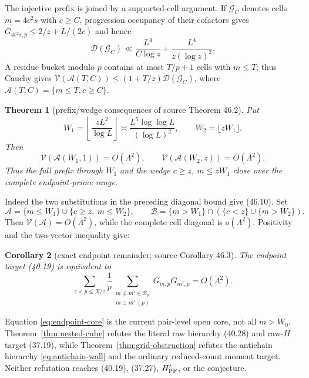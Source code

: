 \documentclass[10pt,reqno]{amsart}
\newtheorem{theorem}{Theorem}[section]
\newtheorem{corollary}[theorem]{Corollary}
\theoremstyle{definition}
\newcommand{\1}{\mathbf 1}
\begin{document}
The injective prefix is joined by a supported-cell argument.  If
$\mathscr G_C$ denotes cells $m=4c^2s$ with $c\geq C$, progression occupancy
of their cofactors gives $G_{4c^2s,p}\leq2/z+L/(2c)$ and hence
\[
 \mathcal D(\mathscr G_C)
 \ll\frac{L^4}{C\log z}+\frac{L^4}{z(\log z)^2}.
\]
A residue bucket modulo $p$ contains at most $T/p+1$ cells with $m\leq T$;
thus Cauchy gives
$\mathcal V(\mathscr A(T,C))\leq(1+T/z)\mathcal D(\mathscr G_C)$, where
$\mathscr A(T,C)=\{m\leq T,c\geq C\}$.
\begin{theorem}[prefix/wedge consequences of source Theorem 46.2]
\label{thm:endpoint-wedge}
Put
\begin{equation}\tag{46.8}
 W_1=\left\lfloor\frac{zL^2}{\log L}\right\rfloor
 \asymp\frac{L^5\log\log L}{(\log L)^2},
 \qquad W_2=\lfloor zW_1\rfloor.
\end{equation}
Then
\begin{equation}\tag{46.10}
 \mathcal V(\mathscr A(W_1,1))=O(\Lambda^2),\qquad
 \mathcal V(\mathscr A(W_2,z))=O(\Lambda^2).
\end{equation}
Thus the full prefix through $W_1$ and the wedge $c\geq z$, $m\leq zW_1$
close over the complete endpoint-prime range.
\end{theorem}
Indeed the two substitutions in the preceding diagonal bound give (46.10).
Set
\[
 \mathscr A=\{m\leq W_1\}\cup\{c\geq z,\ m\leq W_2\},\qquad
 \mathscr B=\{m>W_1\}\cap(\{c<z\}\cup\{m>W_2\}).
\]
Then $\mathcal V(\mathscr A)=O(\Lambda^2)$, while the complete cell
diagonal is $o(\Lambda^2)$.  Positivity and the two-vector inequality give:
\begin{corollary}[exact endpoint remainder; source Corollary 46.3]
\label{cor:endpoint-core}
The endpoint target (40.19) is equivalent to
\begin{equation}\tag{46.13}\label{eq:endpoint-core}
 \boxed{\quad
 \sum_{z<p\leq X/z}\frac1p
 \sum_{\substack{m\ne m'\in\mathscr B_p\\m\equiv m'\ (p)}}
      G_{m,p}G_{m',p}=O(\Lambda^2).\quad}
\end{equation}
\end{corollary}
Equation \eqref{eq:endpoint-core} is the current pair-level open core, not
all $m>W_0$.  Theorem~\ref{thm:nested-cube} refutes the literal raw
hierarchy (40.28) and raw-$H$ target (37.19), while
Theorem~\ref{thm:grid-obstruction} refutes the antichain hierarchy
\eqref{eq:antichain-wall} and the ordinary reduced-count moment target.
Neither refutation reaches (40.19), (37.27), $H_{\rm PF}'$, or the
conjecture.
\end{document}
